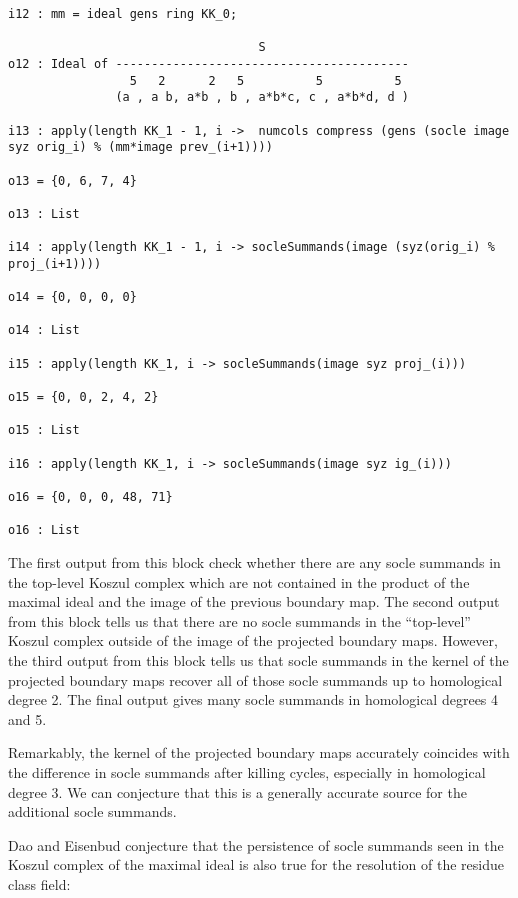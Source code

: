 \documentclass[twoside,12pt, leqno]{amsart}
\begin{document}
\begin{footnotesize}
\begin{verbatim}
i12 : mm = ideal gens ring KK_0;

                                   S
o12 : Ideal of -----------------------------------------
                 5   2      2   5          5          5
               (a , a b, a*b , b , a*b*c, c , a*b*d, d )

i13 : apply(length KK_1 - 1, i ->  numcols compress (gens (socle image syz orig_i) % (mm*image prev_(i+1))))

o13 = {0, 6, 7, 4}

o13 : List

i14 : apply(length KK_1 - 1, i -> socleSummands(image (syz(orig_i) % proj_(i+1))))

o14 = {0, 0, 0, 0}

o14 : List

i15 : apply(length KK_1, i -> socleSummands(image syz proj_(i)))

o15 = {0, 0, 2, 4, 2}

o15 : List

i16 : apply(length KK_1, i -> socleSummands(image syz ig_(i)))

o16 = {0, 0, 0, 48, 71}

o16 : List
\end{verbatim}
\end{footnotesize}

The first output from this block check whether there are any socle summands in the top-level Koszul complex which are not contained in the product of the maximal ideal and the image of the previous boundary map. The second output from this block tells us that there are no socle summands in the ``top-level'' Koszul complex outside of the image of the projected boundary maps. However, the third output from this block tells us that socle summands in the kernel of the projected boundary maps recover all of those socle summands up to homological degree 2. The final output gives many socle summands in homological degrees 4 and 5.

Remarkably, the kernel of the projected boundary maps accurately coincides with the difference in socle summands after killing cycles, especially in homological degree 3. We can conjecture that this is a generally accurate source for the additional socle summands.

Dao and Eisenbud conjecture that the persistence of socle summands seen in the Koszul complex of the maximal ideal is also true for the resolution of the residue class field:
\end{document}
